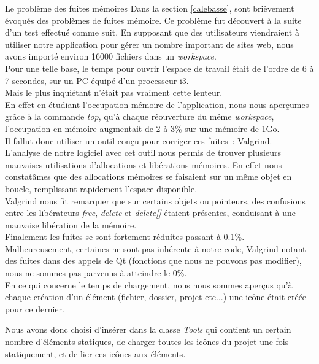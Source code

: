 \documentclass[a4paper, 12pt]{report}
\begin{document}
\begin{chapter}
	\begin{section}{Le problème des fuites mémoires}
		Dans la section \ref{calebasse}, sont brièvement évoqués des problèmes de fuites mémoire. Ce problème fut découvert à la suite
		d'un test effectué comme suit.
		En supposant que des utilisateurs viendraient à utiliser notre application pour gérer un nombre important de sites web, nous avons importé
		environ 16000 fichiers dans un \emph{workspace}.\\
		Pour une telle base, le temps pour ouvrir l'espace de travail était de l'ordre de 6 à 7 secondes, sur un PC équipé d'un processeur i3.\\
		Mais le plus inquiétant n'était pas vraiment cette lenteur.\\
		En effet en étudiant l'occupation mémoire de l'application, nous nous aperçumes grâce à la commande \emph{top},
		qu'à chaque réouverture du même \emph{workspace}, l'occupation en mémoire augmentait de 2 à 3\% sur une mémoire de 1Go.\\


		Il fallut donc utiliser un outil conçu pour corriger ces fuites : \gls{Valgrind}.\\
		L'analyse de notre logiciel avec cet outil nous permis de trouver plusieurs mauvaises utilisations d'allocations et libérations mémoires.
		En effet nous constatâmes que des allocations mémoires se faisaient sur  un même objet en boucle, remplissant rapidement l'espace
		disponible.\\
		\gls{Valgrind} nous fit remarquer que sur certains objets ou pointeurs, des confusions entre les libérateurs \emph{free}, \emph{delete} et
		\emph{delete[]} étaient présentes, conduisant à une mauvaise libération de la mémoire.\\


		Finalement les fuites se sont fortement réduites passant à 0.1\%.\\
		Malheureusement, certaines ne sont pas inhérente à notre code, \gls{Valgrind} notant des fuites dans des appels de \gls{Qt} (fonctions que 
		nous ne pouvons pas modifier), nous ne sommes pas parvenus à atteindre le 0\%.\\

		En ce qui concerne le temps de chargement, nous nous sommes aperçus qu'à chaque création d'un élément (fichier, dossier, projet etc...) une
		icône était créée pour ce dernier.

		Nous avons donc choisi d'insérer dans la classe \emph{Tools} qui contient un certain nombre d'éléments statiques, de charger toutes les
		icônes du projet une fois statiquement, et de lier ces icônes aux éléments.


\end{section}
\end{chapter}
\end{document}
